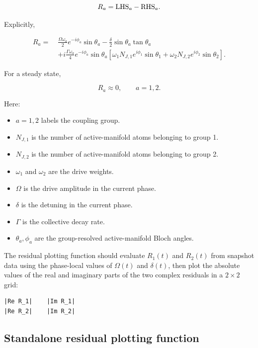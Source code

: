 \documentclass[11pt]{article}
\begin{document}
\begin{equation}
R_a
=
{\rm LHS}_a
-
{\rm RHS}_a.
\end{equation}

Explicitly,

\begin{equation}
\begin{aligned}
R_a
=\;&
\frac{\Omega\omega_a}{2}
e^{-i\phi_a}
\sin\theta_a
-
\frac{\delta}{2}
\sin\theta_a
\tan\theta_a
\\
&+
i
\frac{\Gamma\omega_a}{4}
e^{-i\phi_a}
\sin\theta_a
\left[
\omega_1N_{J,1}e^{i\phi_1}\sin\theta_1
+
\omega_2N_{J,2}e^{i\phi_2}\sin\theta_2
\right].
\end{aligned}
\end{equation}

For a steady state,

\begin{equation}
R_a\approx0,
\qquad
a=1,2.
\end{equation}

Here:

\begin{itemize}
\item \(a=1,2\) labels the coupling group.
\item \(N_{J,1}\) is the number of active-manifold atoms belonging to group 1.
\item \(N_{J,2}\) is the number of active-manifold atoms belonging to group 2.
\item \(\omega_1\) and \(\omega_2\) are the drive weights.
\item \(\Omega\) is the drive amplitude in the current phase.
\item \(\delta\) is the detuning in the current phase.
\item \(\Gamma\) is the collective decay rate.
\item \(\theta_a,\phi_a\) are the group-resolved active-manifold Bloch angles.
\end{itemize}

The residual plotting function should evaluate \(R_1(t)\) and \(R_2(t)\) from
snapshot data using the phase-local values of \(\Omega(t)\) and \(\delta(t)\),
then plot the absolute values of the real and imaginary parts of the two complex
residuals in a \(2\times2\) grid:

\begin{verbatim}
|Re R_1|    |Im R_1|
|Re R_2|    |Im R_2|
\end{verbatim}

\subsection*{Standalone residual plotting function}
\end{document}

